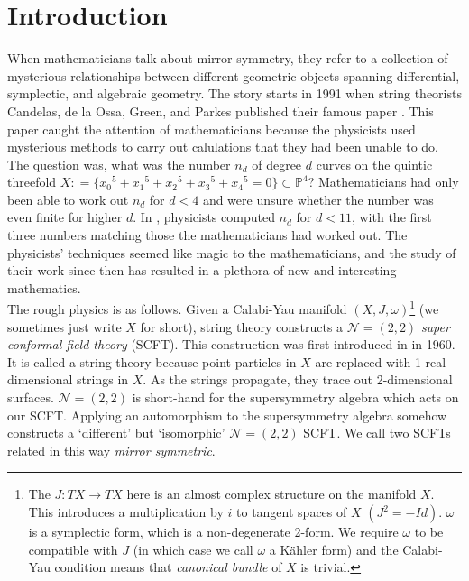 \documentclass[oneside,reqno]{amsart}
\theoremstyle{definition}
\theoremstyle{definition}
\theoremstyle{definition}
\theoremstyle{definition}
\newcommand{\defeq}{\mathrel{\mathop:}=}
\newcommand{\PP}{\mathbb{P}}
\begin{document}
\section{Introduction}
When mathematicians talk about mirror symmetry, they refer to a collection of mysterious relationships between different geometric objects spanning differential, symplectic, and algebraic geometry. The story starts in 1991 when string theorists Candelas, de la Ossa, Green, and Parkes published their famous paper \cite{mirrorsym}. This paper caught the attention of mathematicians because the physicists used mysterious methods to carry out calulations that they had been unable to do. \\
\newline
The question was, what was the number $n_d$ of degree $d$ curves on the quintic threefold $X \defeq \{{x_0}^5 + {x_1}^5 + {x_2}^5 + {x_3}^5 + {x_4}^5 = 0\} \subset \PP^4$? Mathematicians had only been able to work out $n_d$ for $d <4 $ and were unsure whether the number was even finite for higher $d$. In \cite{mirrorsym}, physicists computed $n_d$ for $d < 11$, with the first three numbers matching those the mathematicians had worked out. The physicists' techniques seemed like magic to the mathematicians, and the study of their work since then has resulted in a plethora of new and interesting mathematics. \\
\newline 
The rough physics is as follows. Given a Calabi-Yau manifold $(X,J,\omega)$\footnote{The $J:TX \to TX$ here is an almost complex structure on the manifold $X$. This introduces a multiplication by $i$ to tangent spaces of $X$ $(J^2 = -Id)$. $\omega$ is a symplectic form, which is a non-degenerate 2-form. We require $\omega$ to be compatible with $J$ (in which case we call $\omega$ a Kähler form) and the Calabi-Yau condition means that \textit{canonical bundle} of $X$ is trivial.} (we sometimes just write $X$ for short), string theory constructs a $\mathcal{N}=(2,2)$ \textit{super conformal field theory} (SCFT). This construction was first introduced in \cite[Section 6]{scft} in 1960. It is called a string theory because point particles in $X$ are replaced with 1-real-dimensional strings in $X$. As the strings propagate, they trace out 2-dimensional surfaces. $\mathcal{N}=(2,2)$ is short-hand for the supersymmetry algebra which acts on our SCFT. Applying an automorphism to the supersymmetry algebra somehow constructs a ‘different' but ‘isomorphic' $\mathcal{N}=(2,2)$ SCFT. We call two SCFTs related in this way \textit{mirror symmetric}.
\end{document}
